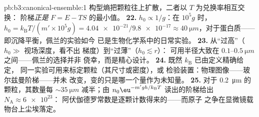 \begin{solution}{pb:b3:canonical-ensemble:1}
构型熵把颗粒往上扩散，二者以 $T$ 为兑换率相互交换：
阶梯\emph{正是} $F = E - TS$ 的最小值。
\textbf{22.} $h_0 \propto 1/g$：在 $10^5g$ 时，
$h_0 = k_{\text{B}}T/(m'\times10^5g) = \num{4.04e-21}/
\num{9.8e-17} \approx \qty{40}{\micro m}$，对于蛋白质——
即沉降平衡，佩兰的实验如今
已是生物化学系中的日常实验。
\textbf{23.} 从“过高”（$h_0 \gg$ 视场深度，看不出
梯度）到“过薄”（$h_0 \lesssim r$）：
可用半径大致在 $0.1$--$\qty{0.5}{\micro m}$ 之间——佩兰的选择并非
侥幸，而是精心设计。
\textbf{24.} 既然 $k_{\text{B}}$ 已由定义精确给定，
同一实验可用来标定颗粒（其尺寸或密度），或
检验装置：物理图像——玻尔兹曼阶梯——并未
改变，变的只是哪一个量作为未知量。
\textbf{25.} 对于 \qty{0.2}{\micro m} 的颗粒，其数量每
$\sim\qty{35}{\micro m}$ 减半；由 $n_0\eu^{-m'gh/k_{\text{B}}
T}$ 读出的阶梯给出 $N_{\text{A}} \approx \num{6e23}$：
阿伏伽德罗常数是逐颗计数得来的——而原子
之争在显微镜载物台上尘埃落定。
\end{solution}
